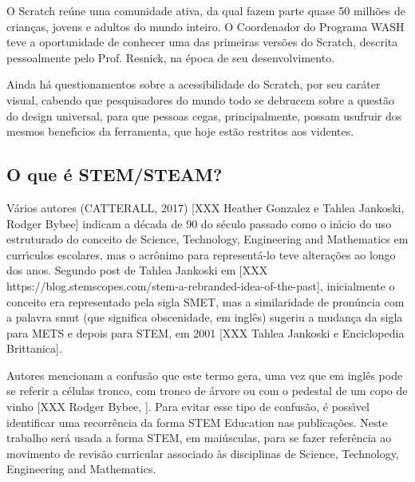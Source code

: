 \documentclass[
12pt,		%
openright,	%
twoside,  %
a4paper,			%
chapter=TITLE,		%
english,			%
french,				%
spanish,			%
brazil				%
]{USPSC-classe/USPSC}
\begin{document}
O Scratch re\'une uma comunidade ativa, da qual fazem parte quase 50 milh\~oes de crian\c{c}as, jovens e adultos do mundo inteiro. O Coordenador do Programa WASH teve a oportunidade de conhecer uma das primeiras vers\~oes do Scratch, descrita pessoalmente pelo Prof. Resnick, na \'epoca de seu desenvolvimento.










Ainda h\'a questionamentos sobre a acessibilidade do Scratch, por seu car\'ater visual, cabendo que pesquisadores do mundo todo se debrucem sobre a quest\~ao do design universal, para que pessoas cegas, principalmente, possam usufruir dos mesmos benef\'{\i}cios da ferramenta, que hoje est\~ao restritos aos videntes.










\subsection[O que \'e STEM/STEAM?]{O que \'e STEM/STEAM?}\label{O que \'e STEM/STEAM?}
V\'arios autores  (CATTERALL, 2017)  [XXX Heather Gonzalez e  Tahlea Jankoski, Rodger Bybee] indicam a d\'ecada de 90 do s\'eculo passado como o in\'{\i}cio do uso estruturado do conceito de Science, Technology, Engineering and Mathematics em curr\'{\i}culos escolares, mas o acr\^onimo para represent\'a-lo teve altera\c{c}\~oes ao longo dos anos. Segundo post de Tahlea Jankoski em [XXX https://blog.stemscopes.com/stem-a-rebranded-idea-of-the-past], inicialmente o conceito era representado pela sigla SMET, mas a similaridade de pron\'uncia com a palavra \textquotedbl smut (que significa obscenidade, em ingl\^es) sugeriu a mudan\c{c}a da sigla para METS e depois para STEM, em 2001 [XXX Tahlea Jankoski e Enciclopedia Brittanica].










Autores mencionam a confus\~ao que este termo gera, uma vez que em ingl\^es pode se referir a c\'elulas tronco, com tronco de \'arvore ou com o pedestal de um copo de vinho [XXX Rodger Bybee, ]. Para evitar esse tipo de confus\~ao, \'e poss\'{\i}vel identificar uma recorr\^encia da forma \textquotedbl STEM Education nas publica\c{c}\~oes. Neste trabalho ser\'a usada a forma STEM, em mai\'usculas, para se fazer refer\^encia ao movimento de revis\~ao curricular associado \`as disciplinas de \textquotedbl Science, Technology, Engineering and Mathematics.  
\end{document}
